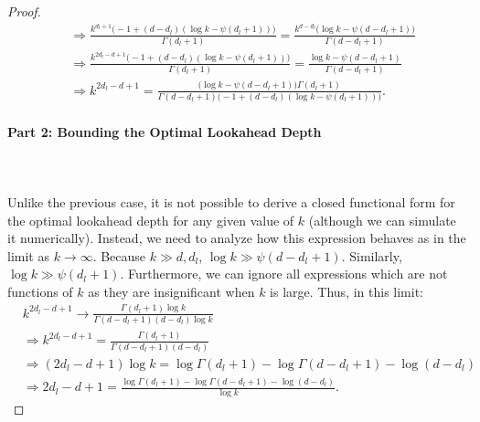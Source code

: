\begin{proof}
\begin{align}
&\Rightarrow\frac{k^{d_l+1}\Big(-1+\left(d-d_l\right)\left(\log k - \psi\left(d_l+1\right)\right)\Big)}{\Gamma(d_l+1)} =  \frac{k^{d-d_l}\Big(\log k-\psi(d-d_l+1)\Big)}{\Gamma(d-d_l+1)}\\
&\Rightarrow \frac{k^{2d_l-d+1}\Big(-1+\left(d-d_l\right)\left(\log k - \psi\left(d_l+1\right)\right)\Big)}{\Gamma(d_l+1)} =  \frac{\log k-\psi(d-d_l+1)}{\Gamma(d-d_l+1)}\\
&\Rightarrow k^{2d_l-d+1} =  \frac{\Big(\log k-\psi(d-d_l+1)\Big)\Gamma(d_l+1)}{\Gamma(d-d_l+1)\Big(-1+\left(d-d_l\right)\left(\log k - \psi\left(d_l+1\right)\right)\Big)}.
\end{align}
\paragraph{Part 2: Bounding the Optimal Lookahead Depth}\leavevmode\leavevmode\\\\
Unlike the previous case, it is not possible to derive a closed functional form for the optimal lookahead depth for any given value of $k$ (although we can simulate it numerically). Instead, we need to analyze how this expression behaves as in the limit as $k \rightarrow \infty$. Because $k \gg d, d_l$, $\log k \gg \psi(d-d_l+1)$. Similarly, $\log k \gg \psi(d_l+1)$. Furthermore, we can ignore all expressions which are not functions of $k$ as they are insignificant when $k$ is large. Thus, in this limit: 
\begin{align}
    &k^{2d_l-d+1} \rightarrow \frac{\Gamma(d_l+1) \log k}{\Gamma(d-d_l+1)(d-d_l)\log k} \\
    &\Rightarrow k^{2d_l-d+1} = \frac{\Gamma(d_l+1)}{\Gamma(d-d_l+1)(d-d_l)} \\
    &\Rightarrow (2d_l-d+1)\log k = \log\Gamma(d_l+1) - \log\Gamma(d-d_l+1) - \log(d-d_l)\\
    &\Rightarrow 2d_l-d+1 = \frac{\log\Gamma(d_l+1) - \log\Gamma(d-d_l+1) - \log(d-d_l)}{\log k}.
\end{align}


\end{proof}
